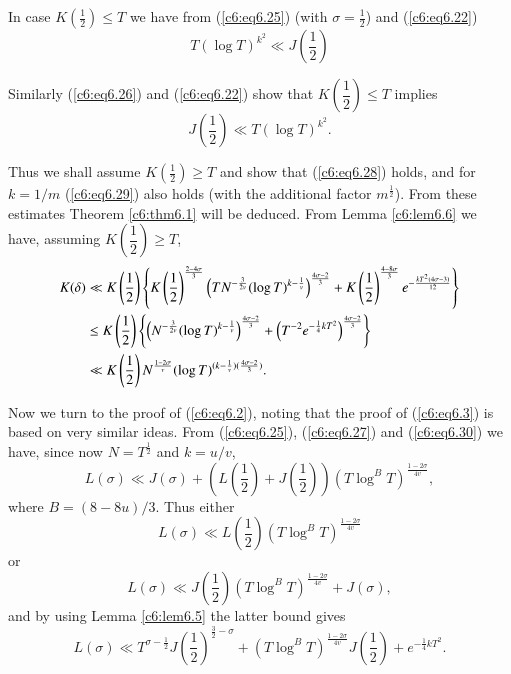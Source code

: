 In case $K(\frac{1}{2}) \leq T$ we have from (\ref{c6:eq6.25}) (with
$\sigma =\frac{1}{2}$) and (\ref{c6:eq6.22})  
\begin{equation}
T(\log T)^{k^2} \ll J \left(\frac{1}{2}
\right)\label{c6:eq6.28} 
\end{equation}

Similarly (\ref{c6:eq6.26}) and (\ref{c6:eq6.22}) show that
$K\left(\dfrac{1}{2} \right) \leq T$ implies  
\begin{equation}
J \left(\frac{1}{2} \right) \ll T (\log
T)^{k^2}. \label{c6:eq6.29} 
\end{equation}\pageoriginale

Thus we shall assume $K(\frac{1}{2}) \geq T$ and show that
(\ref{c6:eq6.28}) holds, and for $k = 1/m$ (\ref{c6:eq6.29}) also
holds (with the additional factor $m^{\frac{1}{2}}$). From these
estimates Theorem \ref{c6:thm6.1} will be deduced. From Lemma
\ref{c6:lem6.6} we have, assuming $K(\dfrac{1}{2}) \geq T$, 
{\fontsize{10}{12}\selectfont
\begin{align}
K(\delta) &\ll K \left(\frac{1}{2} \right) \left\{K \left(\frac{1}{2}
\right)^{\frac{2-4\sigma}{3}} \left(TN^{-\frac{3}{2v}} (\log
T)^{k-\frac{1}{v}} \right)^{\frac{4\sigma-2}{3}} + K \left(\frac{1}{2}
\right)^{\frac{4-8\sigma}{3} } e^{-\frac{kT^2 (4\sigma -3)}{12}}
\right\}\notag\\ 
&\leq K \left(\frac{1}{2} \right) \left\{ \left (N^{-\frac{3}{2v}}
(\log T)^{k-\frac{1}{v}} \right)^{\frac{4\sigma - 2}{3}} + \left(T^{-2}
e^{-\frac{1}{4}k T^2}\right)^{\frac{4\sigma -2}{3}} \right\} 
\label{c6:eq6.30}\\
&\ll K \left(\frac{1}{2} \right) N^{\frac{1-2\sigma}{v}} (\log
T)^{(k-\frac{1}{v})(\frac{4\sigma -2}{3})}.\notag  
\end{align}}

Now we turn  to the proof of (\ref{c6:eq6.2}), noting that the proof
of (\ref{c6:eq6.3}) is based on very similar ideas. From
(\ref{c6:eq6.25}), (\ref{c6:eq6.27}) and (\ref{c6:eq6.30}) we have,
since now $N = T^{\frac{1}{2}}$ and $k = u/v $, 
$$ 
L(\sigma) \ll J(\sigma) + \left(L \left(\frac{1}{2} \right) + J
\left(\frac{1}{2} \right) \right) \left(T \log^B
T\right)^{\frac{1-2\sigma}{4v}},  
$$
where $B = (8-8u)/3$. Thus either 
\begin{equation}
L(\sigma) \ll L \left(\frac{1}{2} \right) \left(T \log^B
T\right)^{\frac{1-2\sigma}{4v}} \label{c6:eq6.31} 
\end{equation}
or 
\begin{equation}
L(\sigma) \ll J \left(\frac{1}{2} \right) \left(T \log^B
T\right)^{\frac{1-2\sigma}{4v}} + J(\sigma), 
\label{c6:eq6.32}
\end{equation}
and by using Lemma \ref{c6:lem6.5} the latter bound gives
\setcounter{equation}{31}
\begin{equation}
L(\sigma ) \ll T^{\sigma-\frac{1}{2}} J \left(\frac{1}{2}
\right)^{\frac{3}{2}-\sigma} + (T \log^B T)^{\frac{1-2\sigma}{4v}} J
\left(\frac{1}{2} \right) + e^{-\frac{1}{4} kT^2}. \label{add-c6:eq6.32}
\end{equation}

